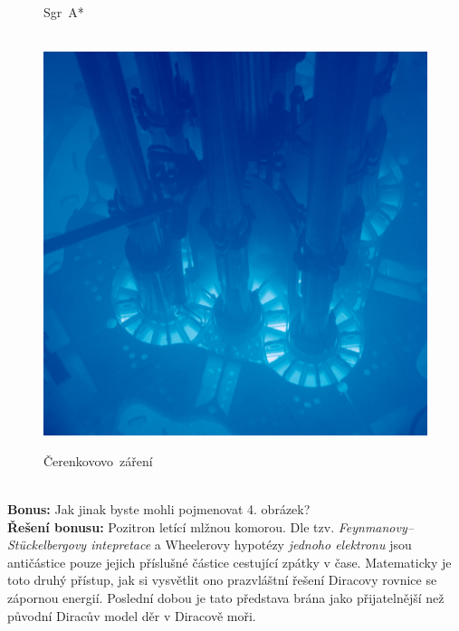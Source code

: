 \documentclass{../../../../style/mkimain}
\begin{document}
\begin{figure}[H]
    \begin{center}
        Sgr~A*\\\ \\
      \end{center}
  \endminipage\hfill
    \includegraphics[width=\linewidth]{images/zareni.jpg}
    \begin{center}
        Čerenkovovo~záření\\\ \\
      \end{center}
  \endminipage
\end{figure}
\noindent\textbf{Bonus:}
Jak jinak byste mohli pojmenovat 4. obrázek?
\\
\noindent\textbf{Řešení bonusu:} Pozitron letící mlžnou komorou. Dle tzv. \emph{Feynmanovy–Stückelbergovy intepretace} a
Wheelerovy hypotézy \emph{jednoho elektronu} jsou antičástice pouze jejich příslušné částice cestující zpátky v čase. Matematicky je toto druhý přístup,
jak si vysvětlit ono prazvláštní řešení Diracovy rovnice se zápornou energií. Poslední dobou je tato představa brána jako přijatelnější než původní Diracův model děr v Diracově moři.
\end{document}
